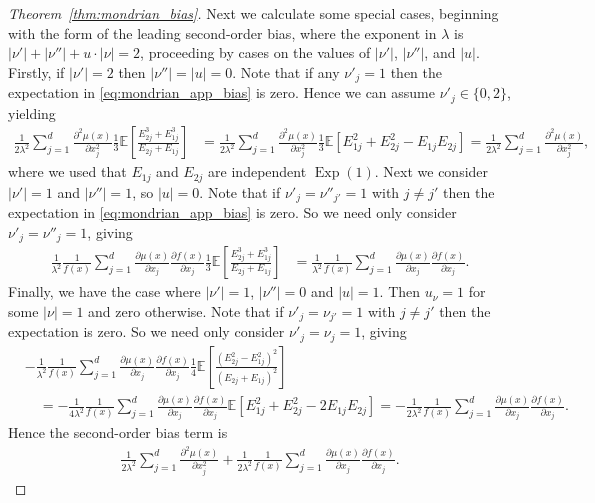 \documentclass[11pt,lof]{puthesis}
\newcommand{\E}{\ensuremath{\mathbb{E}}}
\DeclareMathOperator{\Exp}{Exp}
\theoremstyle{break}
\theoremstyle{proof}
\newtheorem{proof}{Proof}
\begin{document}
\begin{proof}[Theorem~\ref{thm:mondrian_bias}]
Next we calculate some special cases, beginning with
the form of the leading second-order bias,
where the exponent in $\lambda$ is
$|\nu'| + |\nu''| + u \cdot |\nu| = 2$,
proceeding by cases on the values of $|\nu'|$, $|\nu''|$, and $|u|$.
Firstly, if $|\nu'| = 2$ then $|\nu''| = |u| = 0$.
Note that if any $\nu'_j = 1$ then the expectation in
\eqref{eq:mondrian_app_bias} is zero.
Hence we can assume $\nu'_j \in \{0, 2\}$, yielding
%
\begin{align*}
\frac{1}{2 \lambda^2}
\! \sum_{j=1}^d
\frac{\partial^2 \mu(x)}{\partial x_j^2}
\frac{1}{3}
\E \! \left[
\frac{E_{2j}^{3} + E_{1j}^{3}} {E_{2j} + E_{1j}}
\right]
&\!=
\frac{1}{2 \lambda^2}
\! \sum_{j=1}^d
\frac{\partial^2 \mu(x)}{\partial x_j^2}
\frac{1}{3}
\E \! \left[
E_{1j}^{2}
+ E_{2j}^{2}
- E_{1j} E_{2j}
\right]
= \frac{1}{2 \lambda^2}
\! \sum_{j=1}^d
\frac{\partial^2 \mu(x)}{\partial x_j^2},
\end{align*}
%
where we used that $E_{1j}$ and $E_{2j}$ are independent $\Exp(1)$.
Next we consider $|\nu'| = 1$ and $|\nu''| = 1$, so $|u| = 0$.
Note that if $\nu'_j = \nu''_{j'} = 1$ with $j \neq j'$ then the
expectation in \eqref{eq:mondrian_app_bias} is zero.
So we need only consider $\nu'_j = \nu''_j = 1$, giving
%
\begin{align*}
\frac{1}{\lambda^2}
\frac{1}{f(x)}
\sum_{j=1}^{d}
\frac{\partial \mu(x)}{\partial x_j}
\frac{\partial f(x)}{\partial x_j}
\frac{1}{3}
\E \left[
\frac{E_{2j}^{3} + E_{1j}^{3}}
{E_{2j} + E_{1j}}
\right]
&=
\frac{1}{\lambda^2}
\frac{1}{f(x)}
\sum_{j=1}^{d}
\frac{\partial \mu(x)}{\partial x_j}
\frac{\partial f(x)}{\partial x_j}.
\end{align*}
%
Finally, we have the case where $|\nu'| = 1$, $|\nu''| = 0$
and $|u|=1$. Then $u_\nu = 1$ for some $|\nu| = 1$ and zero otherwise.
Note that if $\nu'_j = \nu_{j'} = 1$ with $j \neq j'$ then the
expectation is zero. So we need only consider $\nu'_j = \nu_j = 1$, giving
%
\begin{align*}
&- \frac{1}{\lambda^2}
\frac{1}{f(x)}
\sum_{j=1}^{d}
\frac{\partial \mu(x)}{\partial x_j}
\frac{\partial f(x)}{\partial x_j}
\frac{1}{4}
\E \left[
\frac{(E_{2j}^2 - E_{1j}^2)^2}
{(E_{2j} + E_{1j})^2}
\right] \\
&\quad=
- \frac{1}{4 \lambda^2}
\frac{1}{f(x)}
\sum_{j=1}^{d}
\frac{\partial \mu(x)}{\partial x_j}
\frac{\partial f(x)}{\partial x_j}
\E \left[
E_{1j}^2
+ E_{2j}^2
- 2 E_{1j} E_{2j}
\right]
=
- \frac{1}{2 \lambda^2}
\frac{1}{f(x)}
\sum_{j=1}^{d}
\frac{\partial \mu(x)}{\partial x_j}
\frac{\partial f(x)}{\partial x_j}.
\end{align*}
%
Hence the second-order bias term is
%
\begin{align*}
\frac{1}{2 \lambda^2}
\sum_{j=1}^d
\frac{\partial^2 \mu(x)}{\partial x_j^2}
+ \frac{1}{2 \lambda^2}
\frac{1}{f(x)}
\sum_{j=1}^{d}
\frac{\partial \mu(x)}{\partial x_j}
\frac{\partial f(x)}{\partial x_j}.
\end{align*}


\end{proof}
\end{document}
